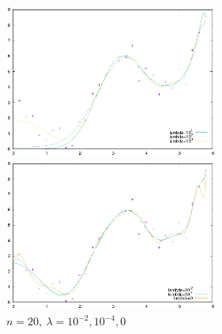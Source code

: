 \documentclass[dvipdfmx,autodetect-engine]{jsarticle}%
\begin{document}
\begin{figure}[htbp]
 \begin{minipage}{0.5\hsize}
  \begin{center}
   \includegraphics[width=70mm]{20_big.eps}
  \end{center}
  \caption{$n=20,~\lambda = 10^4,10^2,10^0$}
  \label{}
 \end{minipage}
 \begin{minipage}{0.5\hsize}
  \begin{center}
   \includegraphics[width=70mm]{20_small.eps}
  \end{center}
  \caption{$n=20,~\lambda = 10^{-2},10^{-4},0$}
  \label{}
 \end{minipage}
\end{figure}
\end{document}

